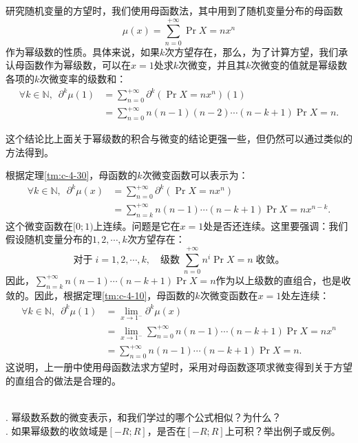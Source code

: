 \documentclass[12pt,UTF8]{ctexbook}
\begin{document}
\begin{appendix}
\begin{et}
    研究随机变量的方望时，我们使用母函数法，其中用到了随机变量分布的母函数
    $$ \mu(x) = \sum_{n=0}^{+\infty} \Pr{X=n} x^n $$
    作为幂级数的性质。具体来说，如果$k$次方望存在，那么，为了计算方望，我们承认母函数作为幂级数，可以在$x=1$处求$k$次微变，并且其$k$次微变的值就是幂级数各项的$k$次微变率的级数和：
    \begin{align*}
        \forall k\in \mathbb{N}, \,\,\, \partial^k \mu(1) &= \sum_{n=0}^{+\infty} \partial^k(\Pr{X=n} x^n)(1) \\ 
        &= \sum_{n=0}^{+\infty} n(n-1)(n-2)\cdots(n-k+1) \Pr{X=n}.
    \end{align*}
    
\end{et}

这个结论比上面关于幂级数的积合与微变的结论更强一些，但仍然可以通过类似的方法得到。

\begin{so}
    根据定理\ref{tm:c-4-30}，母函数的$k$次微变函数可以表示为：
    \begin{align*}
        \forall k\in \mathbb{N}, \,\,\, \partial^k \mu(x) &= \sum_{n=0}^{+\infty} \partial^k(\Pr{X=n} x^n) \\
        &= \sum_{n=k}^{+\infty} n(n-1)\cdots(n-k+1) \Pr{X=n} x^{n-k}.
    \end{align*}
    这个微变函数在$[0;1)$上连续。问题是它在$x=1$处是否还连续。这里要强调：我们假设随机变量分布的$1,2,\cdots, k$次方望存在：
    $$ \mbox{对于}\; i = 1,2,\cdots,k, \quad \mbox{级数}\; \sum_{n=0}^{+\infty} n^i \Pr{X=n} \; \mbox{收敛。} $$
    因此，$\sum_{n=k}^{+\infty} n(n-1)\cdots(n-k+1) \Pr{X=n}$作为以上级数的直组合，也是收敛的。因此，根据定理\ref{tm:c-4-10}，母函数的$k$次微变函数在$x=1$处左连续：
    \begin{align*}
        \forall k\in \mathbb{N}, \,\,\,\partial^k \mu(1) &= \lim_{x\to 1^{-}}\partial^k \mu(x) \\
        &=\lim_{x\to 1^{-}} \sum_{n=0}^{+\infty} n(n-1)\cdots(n-k+1) \Pr{X=n} x^n \\
        &= \sum_{n=0}^{+\infty} n(n-1)\cdots(n-k+1) \Pr{X=n}.
    \end{align*}
    这说明，上一册中使用母函数法求方望时，采用对母函数逐项求微变得到关于方望的直组合的做法是合理的。
\end{so}


\begin{sk}
    \mbox{} \\
    . 幂级数系数的微变表示，和我们学过的哪个公式相似？为什么？\\
    . 如果幂级数的收敛域是$[-R;R]$，是否在$[-R;R]$上可积？举出例子或反例。
\end{sk}


\end{appendix}
\end{document}
